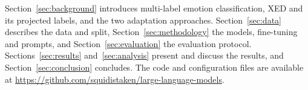 Section~\ref{sec:background} introduces multi-label emotion classification, XED and its projected labels, and the two adaptation approaches. Section~\ref{sec:data} describes the data and split, Section~\ref{sec:methodology} the models, fine-tuning and prompts, and Section~\ref{sec:evaluation} the evaluation protocol. Sections~\ref{sec:results} and~\ref{sec:analysis} present and discuss the results, and Section~\ref{sec:conclusion} concludes. The code and configuration files are available at \url{https://github.com/squidistaken/large-language-models}.
